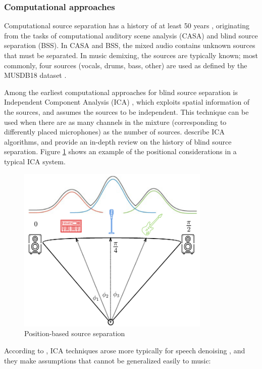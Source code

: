 \documentclass[report.tex]{subfiles}
\begin{document}
\subsubsection{Computational approaches}

Computational source separation has a history of at least 50 years \parencite{musicmask, musicsepintro1}, originating from the tasks of computational auditory scene analysis (CASA) and blind source separation (BSS). In CASA and BSS, the mixed audio contains unknown sources that must be separated. In music demixing, the sources are typically known; most commonly, four sources (vocals, drums, bass, other) are used as defined by the MUSDB18 dataset \parencite{musdb18}.

Among the earliest computational approaches for blind source separation is Independent Component Analysis (ICA)  \parencite{musicmask, musicsepgood, musicsepintro1}, which exploits spatial information of the sources, and assumes the sources to be independent. This technique can be used when there are as many channels in the mixture (corresponding to differently placed microphones) as the number of sources. \textcite{ica1, ica2} describe ICA algorithms, and \textcite{blind1, blind2} provide an in-depth review on the history of blind source separation. Figure \ref{fig:icaposition} shows an example of the positional considerations in a typical ICA system.

\begin{figure}[ht]
	\centering
	\includegraphics[height=8cm]{./images-mss/positional.png}
	\caption{Position-based source separation \parencite[35]{musicsepgood}}
\label{fig:icaposition}
\end{figure}

According to \citeauthor{musicsepintro1}, ICA techniques arose more typically for speech denoising \parencite{speechsep}, and they make assumptions that cannot be generalized easily to music:
\end{document}
